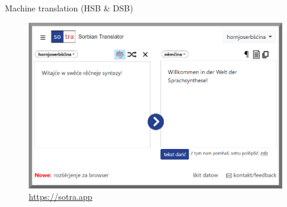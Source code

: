   \begin{block}{Machine translation (HSB \& DSB)}

    
    \begin{figure}
        \centering
        \includegraphics[width=0.7\colwidth]{02_z_01_sotra_rand.png}
        \caption{\url{https://sotra.app}}
        \label{fig:webcaptioner}
    \end{figure}

    

  \end{block}
